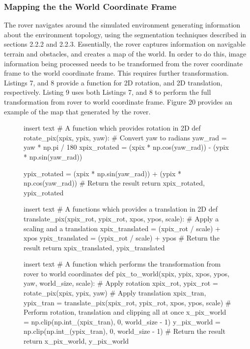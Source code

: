\documentclass[a4paper]{article}
\begin{document}
\subsubsection{Mapping the the World Coordinate Frame}

The rover navigates around the simulated environment generating information about the environment topology, using the segmentation techniques described in sections 2.2.2 and 2.2.3. Essentially, the rover captures information on navigable terrain and obstacles, and creates a map of the world. In order to do this, image information being processed needs to be transformed from the rover coordinate frame to the world coordinate frame. This requires further transformation. Listings 7, and 8 provide a function for 2D rotation, and 2D translation, respectively. Listing 9 uses both Listings 7, and 8 to perform the full transformation from rover to world coordinate frame. Figure 20 provides an example of the map that generated by the rover.

\vspace{1cm}

\begin{figure}[h]\scriptsize
\begin{sexylisting}{insert text}
# A function which provides rotation in 2D
def rotate_pix(xpix, ypix, yaw):
    # Convert yaw to radians
    yaw_rad = yaw * np.pi / 180
    xpix_rotated = (xpix * np.cos(yaw_rad)) - (ypix * np.sin(yaw_rad))
                            
    ypix_rotated = (xpix * np.sin(yaw_rad)) + (ypix * np.cos(yaw_rad))
    # Return the result  
    return xpix_rotated, ypix_rotated
\end{sexylisting}
\end{figure}

\begin{figure}[h]\scriptsize
\begin{sexylisting}{insert text}
# A functions which provides a translation in 2D
def translate_pix(xpix_rot, ypix_rot, xpos, ypos, scale): 
    # Apply a scaling and a translation
    xpix_translated = (xpix_rot / scale) + xpos
    ypix_translated = (ypix_rot / scale) + ypos
    # Return the result  
    return xpix_translated, ypix_translated
\end{sexylisting}
\end{figure}

\begin{figure}[h]\scriptsize
\begin{sexylisting}{insert text}
# A function which performs the transformation from rover to world coordinates
def pix_to_world(xpix, ypix, xpos, ypos, yaw, world_size, scale):
    # Apply rotation
    xpix_rot, ypix_rot = rotate_pix(xpix, ypix, yaw)
    # Apply translation
    xpix_tran, ypix_tran = translate_pix(xpix_rot, ypix_rot, xpos, ypos, scale)
    # Perform rotation, translation and clipping all at once
    x_pix_world = np.clip(np.int_(xpix_tran), 0, world_size - 1)
    y_pix_world = np.clip(np.int_(ypix_tran), 0, world_size - 1)
    # Return the result
    return x_pix_world, y_pix_world
\end{sexylisting}
\end{figure}
\end{document}
